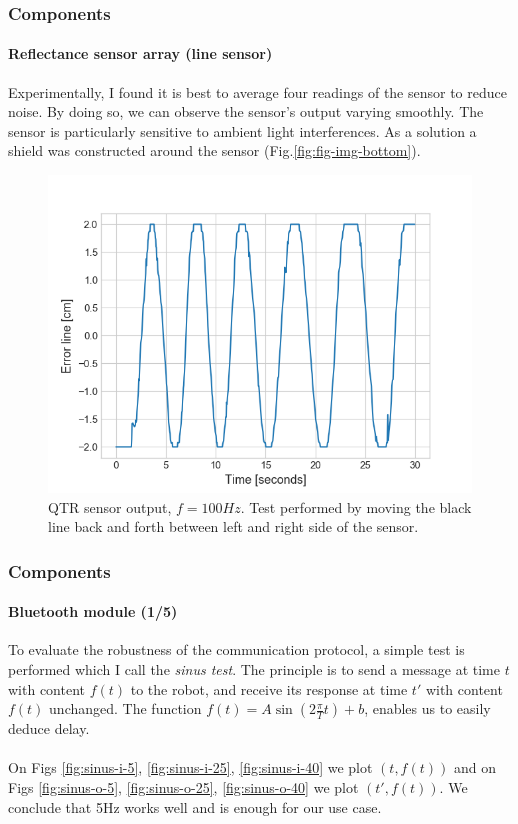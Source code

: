 \documentclass[10pt]{beamer}
\begin{document}
\begin{frame}
\frametitle{Components}
\framesubtitle{Reflectance sensor array (line sensor)}
Experimentally, I found it is best to average four readings of the sensor to reduce noise. By doing so, we can observe the sensor's output varying smoothly. The sensor is particularly sensitive to ambient light interferences. As a solution a shield was constructed around the sensor (Fig.\ref{fig:fig-img-bottom}).
\vspace*{-2mm}
\begin{figure}[hbtp]
\centering
\includegraphics[scale=0.42]{figures/qtr-flow.png}
\vspace*{-4mm}
\caption{QTR sensor output, $f=100Hz$. Test performed by moving the black line back and forth between left and right side of the sensor.}
\label{fig:flow-qtr}
\end{figure}
\end{frame}


\begin{frame}
\frametitle{Components}
\framesubtitle{Bluetooth module (1/5)}
To evaluate the robustness of the communication protocol, a simple test is performed which I call the \textit{sinus test}. The principle is to send a message at time $t$ with content $f(t)$ to the robot, and receive its response at time $t'$ with content $f(t)$ unchanged. The function $f(t) = A\sin(2\frac{\pi}{T}t)+b$, enables us to easily deduce delay. \\~\\
On Figs \ref{fig:sinus-i-5}, \ref{fig:sinus-i-25}, \ref{fig:sinus-i-40} we plot $(t,f(t))$ and on Figs \ref{fig:sinus-o-5}, \ref{fig:sinus-o-25}, \ref{fig:sinus-o-40} we plot $(t',f(t))$. We conclude that 5Hz works well and is enough for our use case.
\end{frame}
\end{document}
